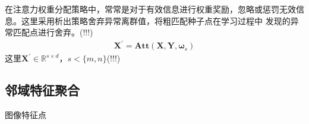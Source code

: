 \documentclass[10pt]{article}
\begin{document}
在注意力权重分配策略中，常常是对于有效信息进行权重奖励，忽略或惩罚无效信息。这里采用析出策略舍弃异常离群值，将粗匹配种子点在学习过程中
发现的异常匹配点进行舍弃。(!!!)
\begin{align}
    \mathbf{X}^{'}=\mathbf{Att}(\mathbf{X}, \mathbf{Y}, \mathbf{\omega}_{s})
\end{align}
这里$\mathbf{X}^{'}\in \mathbb{R}^{s \times d}$，$s<\{m,n\}$(!!!)
\subsection{邻域特征聚合}
图像特征点

    


\newpage 
% 







\end{document}
